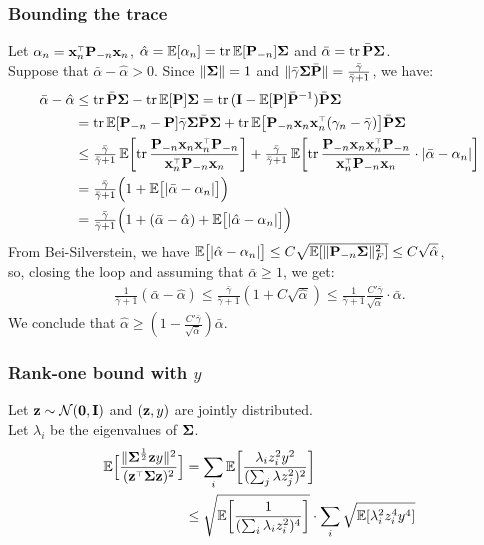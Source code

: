\documentclass[10pt]{beamer}
\begin{document}
  \begin{frame}
    \frametitle{Bounding the trace}
Let $\alpha_n = \x_n^\top\P_{-n}\x_n$, $\hat\alpha =\mathbb E[\alpha_n]=
\mathrm{tr}\,\mathbb E[\mathbf P_{-n}]\mathbf{\Sigma}$ and $\bar \alpha=\mathrm{tr}\,\bar{\mathbf P}
\mathbf{\Sigma}$. \\
Suppose that $\bar\alpha - \hat\alpha>0$. Since $\|\mathbf{\Sigma}\|=1$ and
$\|\bar\gamma\mathbf{\Sigma}\bar{\mathbf P}\|=\frac{\bar\gamma}{\bar\gamma+1}$, we have:
    \begin{align*}
      \bar\alpha - \hat\alpha &\leq \tr\,\bar\P\Sigmab - \tr\,\E[\P]\Sigmab
      = \tr\,(\I-\E[\P]\bar\P^{-1})\bar\P\Sigmab \\
      &=\tr\, \E[\P_{-n}-\P]\bar\gamma\Sigmab\bar\P\Sigmab +
        \tr\,\E\big[\P_{-n}\x_n\x_n^\top(\gamma_n-\bar\gamma)\big]\bar\P\Sigmab
      \\
      &\leq \tfrac{\bar\gamma}{\bar\gamma+1}\,
        \E\bigg[\tr\,\frac{\P_{-n}\x_n\x_n^\top\P_{-n}}{\x_n^\top\P_{-n}\x_n}\bigg]
        +\tfrac{\bar\gamma}{\bar\gamma+1}\,
        \E\bigg[\tr\,\frac{\P_{-n}\x_n\x_n^\top\P_{-n}}{\x_n^\top\P_{-n}\x_n}
        \cdot|\bar\alpha-\alpha_n|\bigg]\\
&=\tfrac{\bar\gamma}{\bar\gamma+1}\Big(1 + \E\big[|\bar\alpha - \alpha_n|\big]\Big)\\
      &=\tfrac{\bar\gamma}{\bar\gamma+1}\Big(1+ (\bar\alpha - \hat\alpha) +\E\big[|\hat\alpha-\alpha_n|\big]\Big)
    \end{align*}
    From Bei-Silverstein, we have
    $\mathbb E\big[|\hat\alpha-\alpha_n|\big]\leq
    C\sqrt{\mathbb E[\|\mathbf P_{-n}\mathbf{\Sigma}\|_F^2]}\leq C\sqrt{\hat\alpha}$,\\
    so, closing the loop and assuming that $\bar\alpha\geq 1$, we get:
    \begin{align*}
      \tfrac1{\bar\gamma+1}(\bar\alpha-\hat\alpha)\leq
      \tfrac{\bar\gamma} {\bar\gamma+1}
      (1+C\sqrt{\hat\alpha})\leq\tfrac1{\bar\gamma+1}\tfrac{C'\bar\gamma}
      {\sqrt{\bar\alpha}}\cdot\bar\alpha. 
    \end{align*}
    We conclude that $\hat\alpha\geq (1-\frac{C'\bar\gamma}{\sqrt{\bar\alpha}})\bar\alpha$.
  \end{frame}

  \begin{frame}
    \frametitle{Rank-one bound with $y$}
Let $\mathbf z\sim\mathcal{N}(\mathbf 0,\mathbf I)$ and $(\mathbf z,y)$ are jointly
distributed. \\
Let $\lambda_i$ be the eigenvalues of $\mathbf{\Sigma}$.
\begin{align*}
  \E\Big[\frac{\|\Sigmab^{\frac12}\z y\|^2}{(\z^\top\Sigmab\z)^2}\Big]
  &=\sum_i
   \E\bigg[\frac{\lambda_iz_i^2y^2}{(\sum_j\lambda z_j^2)^2}\bigg]\\
 &\leq \sqrt{\E\bigg[\frac1{(\sum_i\lambda_iz_i^2)^4}\bigg]}\cdot\sum_i\sqrt{\E[\lambda_i^2 z_i^4y^4]}
\end{align*}
\end{frame}
\end{document}

